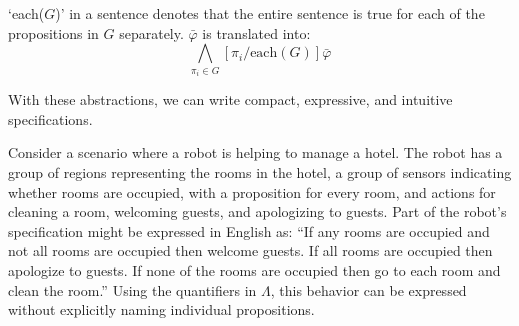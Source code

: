 `each($G$)' in a sentence denotes that the entire sentence is true for each of the propositions in $G$ separately. 
$\bar{\varphi}$ is translated into:
\begin{equation*}
 	\bigwedge\limits_{\pi_i \in G} [\pi_i / \text{each}(G)] \bar{\varphi}
\end{equation*}
\par
With these abstractions, we can write compact, expressive, and intuitive specifications. 
\par
\begin{myExample}\label{Ex:quantifiers} 	
	Consider a scenario where a robot is helping to manage a hotel. 
	The robot has a group of regions representing the rooms in the hotel, a group of sensors indicating whether rooms are occupied, with a proposition for every room, and actions for cleaning a room, welcoming guests, and apologizing to guests. 
	Part of the robot's specification might be expressed in English as:
	``If any rooms are occupied and not all rooms are occupied then welcome guests. 
	If all rooms are occupied then apologize to guests. 
	If none of the rooms are occupied then go to each room and clean the room.''
	Using the quantifiers in $\Lambda$, this behavior can be expressed without explicitly naming individual propositions. 
\end{myExample}

